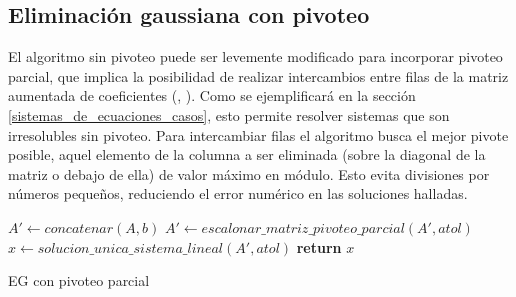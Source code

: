 \subsection{Eliminación gaussiana con pivoteo}
\label{sistemas_de_ecuaciones_EG_con}

El algoritmo sin pivoteo puede ser levemente modificado para incorporar pivoteo parcial, que implica la posibilidad de realizar intercambios entre filas de la matriz aumentada de coeficientes (, ). Como se ejemplificará en la sección \ref{sistemas_de_ecuaciones_casos}, esto permite resolver sistemas que son irresolubles sin pivoteo. Para intercambiar filas el algoritmo busca el mejor pivote posible, aquel elemento de la columna a ser eliminada (sobre la diagonal de la matriz o debajo de ella) de valor máximo en módulo. Esto evita divisiones por números pequeños, reduciendo el error numérico en las soluciones halladas.


\begin{algorithm}[H]
\begin{algorithmic}[1]
    \State $A' \gets concatenar(A, b)$ 
    \State $A' \gets escalonar\_matriz\_pivoteo\_parcial(A', atol)$ 
    \State $x \gets solucion\_unica\_sistema\_lineal(A', atol)$ 
    \State \textbf{return} $x$
\EndFunction
\end{algorithmic}
\caption{EG con pivoteo parcial}
\label{alg:eg_con_pivoteo}
\end{algorithm}

